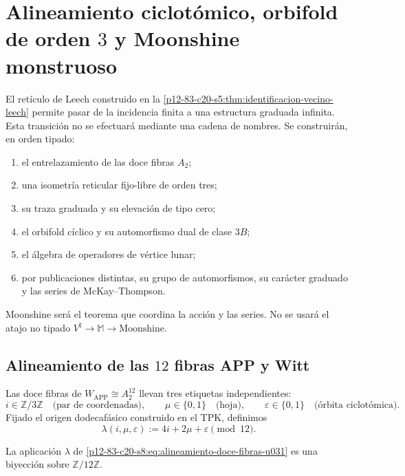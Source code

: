 \section{Alineamiento ciclotómico, orbifold de orden \(3\) y Moonshine monstruoso}
\label{p12-83-c20-s8:chap:alineamiento-orbifold-moonshine}

El retículo de Leech construido en la
\cref{p12-83-c20-s5:thm:identificacion-vecino-leech} permite pasar de la incidencia
finita a una estructura graduada infinita. Esta transición no se efectuará
mediante una cadena de nombres. Se construirán, en orden tipado:
\begin{enumerate}
 \item el entrelazamiento de las doce fibras \(A_2\);
 \item una isometría reticular fijo-libre de orden tres;
 \item su traza graduada y su elevación de tipo cero;
 \item el orbifold cíclico y su automorfismo dual de clase \(3B\);
 \item el álgebra de operadores de vértice lunar;
 \item por publicaciones distintas, su grupo de automorfismos, su carácter
       graduado y las series de McKay--Thompson.
\end{enumerate}
Moonshine será el teorema que coordina la acción y las series. No se usará
el atajo no tipado
\(V^\natural\to\mathbb M\to\text{Moonshine}\).

\subsection{Alineamiento de las \(12\) fibras APP y Witt}

Las doce fibras de \(W_{\mathrm{APP}}\cong A_2^{12}\) llevan tres
etiquetas independientes:
\[
 i\in\mathbb Z/3\mathbb Z
 \quad\text{(par de coordenadas)},\qquad
 \mu\in\{0,1\}
 \quad\text{(hoja)},\qquad
 \varepsilon\in\{0,1\}
 \quad\text{(órbita ciclotómica)}.
\]
Fijado el origen dodecafásico construido en el TPK, definimos
\begin{equation}
 \lambda(i,\mu,\varepsilon)
 :=4i+2\mu+\varepsilon\pmod{12}.
 \label{p12-83-c20-s8:eq:alineamiento-doce-fibras-u031}
\end{equation}

\begin{lemma}
\label{p12-83-c20-s8:lem:biyectividad-alineamiento-u031}
La aplicación \(\lambda\) de
\eqref{p12-83-c20-s8:eq:alineamiento-doce-fibras-u031} es una biyección sobre
\(\mathbb Z/12\mathbb Z\).
\end{lemma}

